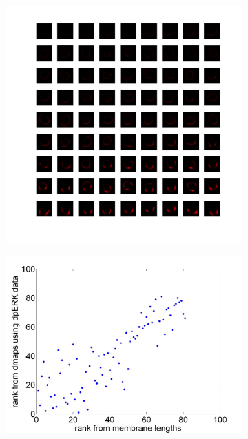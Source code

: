 \documentclass[12pt]{article}
\begin{document}
\begin{figure}
\begin{subfigure}[c]{0.45\textwidth}
\includegraphics[width=\textwidth]{dpERK_array}
\caption{}
\end{subfigure}
\begin{subfigure}[c]{0.5\textwidth}
\includegraphics[width=\textwidth]{dpERK_rank_corr}
\caption{}
\end{subfigure}
\end{figure}
\end{document}
